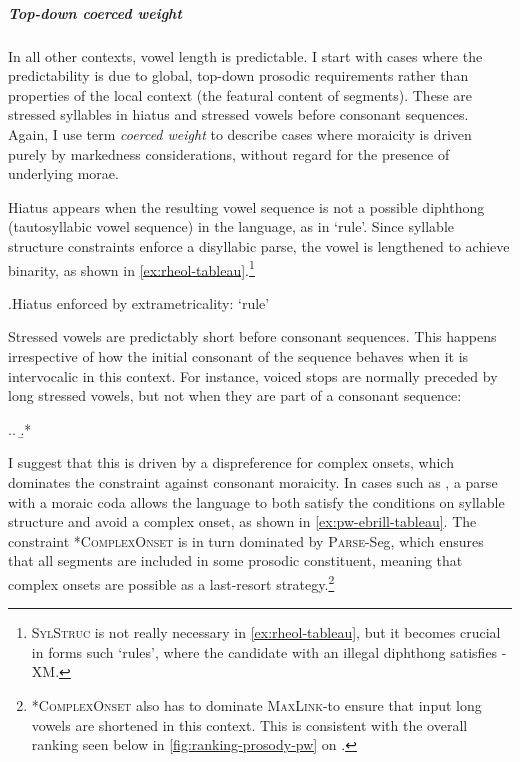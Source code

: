 \subparagraph{Top-down coerced weight}
\label{sec:top-down-coerced}

In all other contexts, vowel length is predictable. I start with cases where the predictability is due to global, top-down prosodic requirements rather than properties of the local context (\ie the featural content of segments). These are stressed syllables in hiatus and stressed vowels before consonant sequences. Again, I use  term \emph{coerced weight} to describe cases where moraicity is driven purely by markedness considerations, without regard for the presence of underlying morae.

Hiatus appears when the resulting vowel sequence is not a possible diphthong (\ie tautosyllabic vowel sequence) in the language, as in \ipa{[ˈr̥eːol]} `rule'. Since syllable structure constraints enforce a disyllabic parse, the vowel is lengthened to achieve binarity, as shown in \cref{ex:rheol-tableau}.\footnote{\textsc{SylStruc} is not really necessary in \cref{ex:rheol-tableau}, but it becomes crucial in forms such \ipa{[r̥eˈoːle]} `rules', where the candidate  with an illegal diphthong satisfies \sy-\textsc{XM}.}

\ex.\label{ex:rheol-tableau}Hiatus enforced by extrametricality: \ipa{[ˈr̥eːol]} `rule'\\

Stressed vowels are predictably short before consonant sequences. This happens irrespective of how the initial consonant of the sequence behaves when it is intervocalic in this context. For instance, voiced stops are normally preceded by long stressed vowels, but not when they are part of a consonant sequence:

\ex.\a.
\b.*\mbi{[ˈeːbriɬ]}

I suggest that this is driven by a dispreference for complex onsets, which dominates the constraint against consonant moraicity. In cases such as \ipa{[ˈebriɬ]}, a parse with a moraic coda allows the language to both satisfy the conditions on syllable structure and avoid a complex onset, as shown in \ref{ex:pw-ebrill-tableau}. The constraint *\textsc{ComplexOnset} is in turn dominated by \textsc{Parse}-Seg, which ensures that all segments are included in some prosodic constituent, meaning that complex onsets are possible as a last\hyp resort strategy.\footnote{*\textsc{ComplexOnset} also has to dominate \textsc{MaxLink}-\mo[V] to ensure that input long vowels are shortened in this context. This is consistent with the overall ranking seen below in \cref{fig:ranking-prosody-pw} on .}

